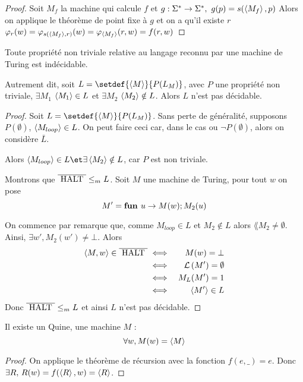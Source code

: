 \begin{proof}
	Soit $M_f$ la machine qui calcule $f$ et $g : \Sigma^{*} \to \Sigma^{*}, \ g(p) = s(\left\langle M_f\right\rangle, p)$
	Alors on applique le théorème de point fixe à $g$ et on a qu'il existe $r$ \tq $\varphi_r(w)
		=\varphi_{s(\left\langle M_f\right\rangle,r)} (w) = \varphi_{\left\langle M_f\right\rangle} (r,w) = f(r,w)$
\end{proof}


\begin{theorem}[de Rice]
	Toute propriété non triviale relative au langage reconnu par une machine de Turing est indécidable.

	Autrement dit, soit $L = \setdef {\encode M} {P(L_M)}$, avec $P$ une propriété non triviale, \ie $\exists M_1$ \tq
	$\left\langle M_1\right\rangle \in L$ et $\exists M_2$ \tq $\left\langle M_2\right\rangle \notin L$. Alors $L$ n'est pas décidable.
\end{theorem}


\begin{proof}
	Soit $L = \setdef {\encode M} {P(L_M)}$.
	Sans perte de généralité, supposons $P(\emptyset)$, \ie $\left\langle M_{loop}\right\rangle \in L$.
	On peut faire ceci car, dans le cas ou $\lnot P (\emptyset)$, alors on considère $\bar L$.

	Alors $\encode {M_{loop}} \in L \et \exists \encode{M_2} \notin L$, car $P$ est non triviale.

	Montrons que $\overline {\text{ HALT }} \leq_m L$.
	Soit $M$ une machine de Turing, pour tout $w$ on pose
	$$M' = \textbf{fun } u \rightarrow M(w); M_2(u)$$

    On commence par remarque que, comme $M_{loop} \in L$ et $M_2 \notin L$ alors $\lang {M_2} \neq \emptyset$. Ainsi,
	$\exists w', M_2(w') \neq \bot$.
	Alors
	\begin{eqnarray*}
		\left\langle M,w\right\rangle \in \overline{\text{ HALT }}  &\iff& M(w) = \bot \\
		&\iff& \mathcal{L}\left(M'\right) = \emptyset \\
		&\iff& M_L (M') = 1 \\
		&\iff& \left\langle M'\right\rangle \in L
	\end{eqnarray*}
	Donc $\overline {\text{ HALT }} \leq_m L$ et ainsi $L$ n'est pas décidable.
\end{proof}



\begin{prop}
	Il existe un Quine, \ie une machine $M$ \tq :
	$$\forall w, M(w) = \left\langle M\right\rangle$$
\end{prop}

\begin{proof}
	On applique le théorème de récursion avec la fonction $f(e, \_) = e$. Donc $\exists R, \, R(w) = f(\left\langle R\right\rangle, w) = \left\langle R\right\rangle$.
\end{proof}

